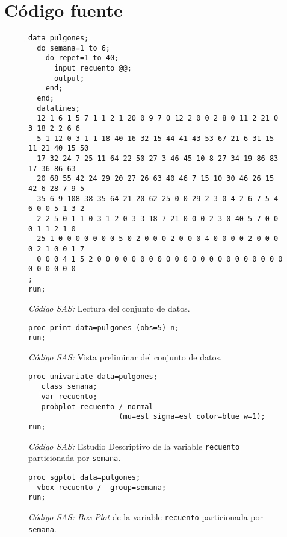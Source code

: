 \documentclass[11pt]{article}
\begin{document}
  \section{Código fuente}
  \label{sec:code}

    \begin{figure}[!h]
      \centering
      \begin{verbatim}
data pulgones;
  do semana=1 to 6;
    do repet=1 to 40;
      input recuento @@;
      output;
    end;
  end;
  datalines;
  12 1 6 1 5 7 1 1 2 1 20 0 9 7 0 12 2 0 0 2 8 0 11 2 21 0 3 18 2 2 6 6
  5 1 12 0 3 1 1 18 40 16 32 15 44 41 43 53 67 21 6 31 15 11 21 40 15 50
  17 32 24 7 25 11 64 22 50 27 3 46 45 10 8 27 34 19 86 83 17 36 86 63
  20 68 55 42 24 29 20 27 26 63 40 46 7 15 10 30 46 26 15 42 6 28 7 9 5
  35 6 9 108 38 35 64 21 20 62 25 0 0 29 2 3 0 4 2 6 7 5 4 6 0 0 5 1 3 2
  2 2 5 0 1 1 0 3 1 2 0 3 3 18 7 21 0 0 0 2 3 0 40 5 7 0 0 0 1 1 2 1 0
  25 1 0 0 0 0 0 0 0 5 0 2 0 0 0 2 0 0 0 4 0 0 0 0 2 0 0 0 0 2 1 0 0 1 7
  0 0 0 4 1 5 2 0 0 0 0 0 0 0 0 0 0 0 0 0 0 0 0 0 0 0 0 0 0 0 0 0 0 0 0
;
run;
      \end{verbatim}
      \caption{\emph{Código SAS:} Lectura del conjunto de datos.}
      \label{code:sas_1}
    \end{figure}


    \begin{figure}[!h]
      \centering
      \begin{verbatim}
proc print data=pulgones (obs=5) n;
run;
      \end{verbatim}
      \caption{\emph{Código SAS:} Vista preliminar del conjunto de datos.}
      \label{code:sas_2}
    \end{figure}

    \begin{figure}[!h]
      \centering
      \begin{verbatim}
proc univariate data=pulgones;
   class semana;
   var recuento;
   probplot recuento / normal
                     (mu=est sigma=est color=blue w=1);
run;
      \end{verbatim}
      \caption{\emph{Código SAS:} Estudio Descriptivo de la variable \texttt{recuento} particionada por \texttt{semana}.}
      \label{code:sas_3}
    \end{figure}

    \begin{figure}[!h]
      \centering
      \begin{verbatim}
proc sgplot data=pulgones;
  vbox recuento /  group=semana;
run;
      \end{verbatim}
      \caption{\emph{Código SAS:} \emph{Box-Plot} de la variable \texttt{recuento} particionada por \texttt{semana}.}
      \label{code:sas_4}
    \end{figure}
\end{document}
